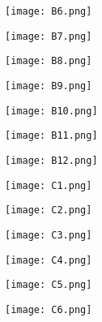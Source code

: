 \documentclass{article}
\begin{document}
\begin{figure}[!hb]
\centering
\texttt{[image:  B6.png]}
\end{figure}


\begin{figure}[!hb]
\centering
\texttt{[image:  B7.png]}
\end{figure}

\begin{figure}[!hb]
\centering
\texttt{[image:  B8.png]}
\end{figure}

\begin{figure}[!hb]
\centering
\texttt{[image:  B9.png]}
\end{figure}

\begin{figure}[!hb]
\centering
\texttt{[image:  B10.png]}
\end{figure}

\begin{figure}[!hb]
\centering
\texttt{[image:  B11.png]}
\end{figure}

\begin{figure}[!hb]
\centering
\texttt{[image:  B12.png]}
\end{figure}

\begin{figure}[!hb]
\centering
\texttt{[image:  C1.png]}
\end{figure}

\begin{figure}[!hb]
\centering
\texttt{[image:  C2.png]}
\end{figure}

\begin{figure}[!hb]
\centering
\texttt{[image:  C3.png]}
\end{figure}

\begin{figure}[!hb]
\centering
\texttt{[image:  C4.png]}
\end{figure}

\begin{figure}[!hb]
\centering
\texttt{[image:  C5.png]}
\end{figure}

\begin{figure}[!hb]
\centering
\texttt{[image:  C6.png]}
\end{figure}
\end{document}
